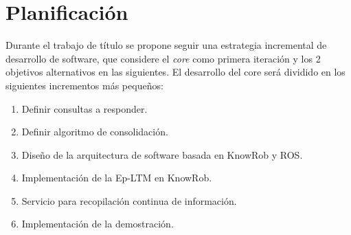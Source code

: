 



\section{Planificación}

Durante el trabajo de título se propone seguir una estrategia incremental de desarrollo de software, que considere el \textit{core} como primera iteración y los 2 objetivos alternativos en las siguientes. El desarrollo del core será dividido en los siguientes incrementos más pequeños:
\begin{enumerate}[topsep=0pt]
\setlength\itemsep{0.2em}
\item Definir consultas a responder.

\item Definir algoritmo de consolidación.

\item Diseño de la arquitectura de software basada en KnowRob y ROS.

\item Implementación de la Ep-LTM en KnowRob.

\item Servicio para recopilación continua de información.

\item Implementación de la demostración.
\end{enumerate}



